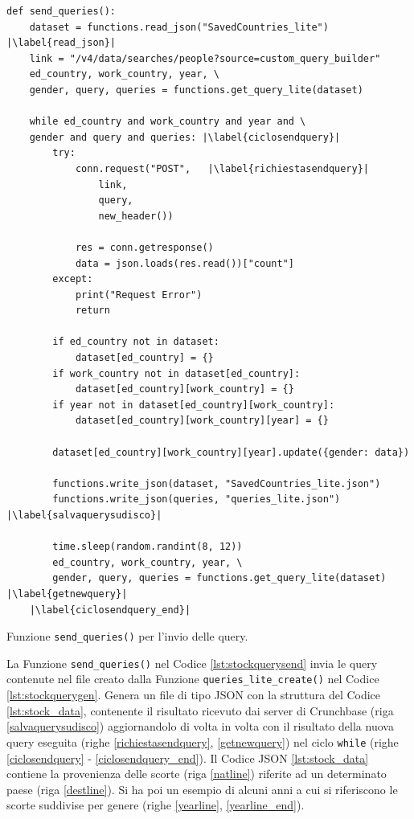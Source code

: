 \begin{listing}[htbp]
\begin{verbatim}
def send_queries():
    dataset = functions.read_json("SavedCountries_lite") |\label{read_json}|
    link = "/v4/data/searches/people?source=custom_query_builder"
    ed_country, work_country, year, \
    gender, query, queries = functions.get_query_lite(dataset)
    
    while ed_country and work_country and year and \ 
    gender and query and queries: |\label{ciclosendquery}|
        try:
            conn.request("POST",   |\label{richiestasendquery}|
                link, 
                query, 
                new_header())
                
            res = conn.getresponse()
            data = json.loads(res.read())["count"]
        except:
            print("Request Error")
            return
            
        if ed_country not in dataset:
            dataset[ed_country] = {}
        if work_country not in dataset[ed_country]:
            dataset[ed_country][work_country] = {}
        if year not in dataset[ed_country][work_country]:
            dataset[ed_country][work_country][year] = {}
        
        dataset[ed_country][work_country][year].update({gender: data})
        
        functions.write_json(dataset, "SavedCountries_lite.json")
        functions.write_json(queries, "queries_lite.json") |\label{salvaquerysudisco}|
        
        time.sleep(random.randint(8, 12))
        ed_country, work_country, year, \ 
        gender, query, queries = functions.get_query_lite(dataset) |\label{getnewquery}|
    |\label{ciclosendquery_end}|
\end{verbatim}
\caption{Funzione \texttt{send\_queries()} per l'invio delle query.}
\label{lst:stockquerysend}
\end{listing}

La Funzione \texttt{send\_queries()} nel Codice \ref{lst:stockquerysend} invia le query contenute nel file creato dalla Funzione \texttt{queries\_lite\_create()} nel Codice \ref{lst:stockquerygen}. 
Genera un file di tipo JSON con la struttura del Codice \ref{lst:stock_data}, contenente il risultato ricevuto dai server di Crunchbase (riga \ref{salvaquerysudisco}) aggiornandolo di volta in volta con il risultato della nuova query eseguita (righe  \ref{richiestasendquery}, \ref{getnewquery}) nel ciclo \texttt{while} (righe \ref{ciclosendquery} - \ref{ciclosendquery_end}).
Il Codice JSON \ref{lst:stock_data} contiene la provenienza delle scorte (riga \ref{natline}) riferite ad un determinato paese (riga \ref{destline}). Si ha poi un esempio di alcuni anni a cui si riferiscono le scorte suddivise per genere (righe \ref{yearline}, \ref{yearline_end}). 

